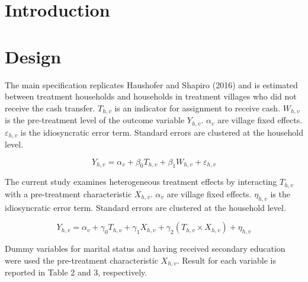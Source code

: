 \documentclass[11pt]{article}
\begin{document}
\section{Introduction}


\section{Design}
The main specification replicates Haushofer and Shapiro (2016) and is estimated between treatment households and households in treatment villages who did not receive the cash transfer. $T_{h,v}$ is an indicator for assignment to receive cash. $W_{h,v}$ is the pre-treatment level of the outcome variable $Y_{h,v}$. $\alpha_v$ are village fixed effects. $\varepsilon_{h,v}$ is the idiosyncratic error term. Standard errors are clustered at the household level.

    \[ Y_{h,v} = \alpha_v + \beta_0 T_{h,v} + \beta_1 W_{h,v} + \varepsilon_{h,v} \]

The current study examines heterogeneous treatment effects by interacting $T_{h,v}$ with a pre-treatment characteristic $X_{h,v}$. $\alpha_v$ are village fixed effects. $\eta_{h,v}$ is the idiosyncratic error term. Standard errors are clustered at the household level.

    \[ Y_{h,v} = \alpha_v + \gamma_0 T_{h,v} + \gamma_1 X_{h,v} + \gamma_2 (T_{h,v} \times X_{h,v}) + \eta_{h,v} \]

Dummy variables for marital status and having received secondary education were used the pre-treatment characteristic $X_{h,v}$. Result for each variable is reported in Table 2 and 3, respectively. 
\end{document}
